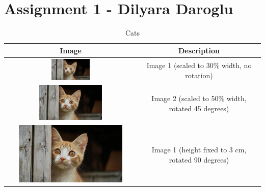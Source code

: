 \documentclass[a4paper,12pt]{article}
\begin{document}
	\centering
	\section*{Assignment 1 - Dilyara Daroglu}
	\begin{table}[h!]
		\centering 
		\caption{Cats}
		\begin{tabular}{|c|c|}
			\hline
			\textbf{Image} & \textbf{Description} \\ \hline
			\includegraphics[width=0.3\textwidth, angle=0]{Image1.jpg} & Image 1 ({\scriptsize scaled to 30\% width, no rotation}) \\ \hline
			\includegraphics[width=0.5\textwidth, angle=45]{Image1.jpg} & Image 2 ({\scriptsize scaled to 50\% width, rotated 45 degrees}) \\ \hline
			\includegraphics[height=3cm, angle=90]{Image1.jpg} & Image 1 ({\scriptsize height fixed to 3 cm, rotated 90 degrees}) \\ \hline
		\end{tabular}
	\end{table}
\end{document}
